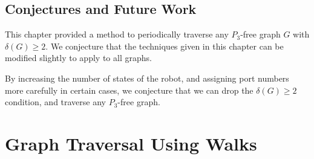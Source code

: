 \documentclass[12pt,letterpaper,oneside]{book}
\begin{document}
\newpage
\section{Conjectures and Future Work}

This chapter provided a method to periodically traverse any $P_3$-free graph $G$ 
with $\delta(G)\ge 2$.  
We conjecture that the techniques given in this chapter can be modified slightly to apply to all graphs.

By increasing the number of states of the robot, and assigning port numbers more carefully 
in certain cases, we conjecture that we can drop the $\delta(G)\ge 2$ condition, and 
traverse any $P_3$-free graph.  









\chapter{Graph Traversal Using Walks} %
\label{sec-geo}


\end{document}
